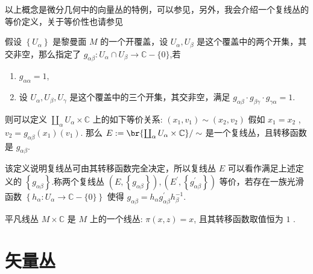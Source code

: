 以上概念是微分几何中的向量丛的特例，可以参见\cite{吴大任1979微分几何讲义}，另外，我会介绍一个复线丛的等价定义，关于等价性也请参见\cite{吴大任1979微分几何讲义}
\begin{definition}[][复线丛的等价定义]
    假设 $\left\{U_\alpha\right\}$ 是黎曼面 $M$ 的一个开覆盖，设 $U_\alpha, U_\beta$ 是这个覆盖中的两个开集，其交非空，那么指定了
$g_{\alpha \beta}: U_\alpha \cap U_\beta \rightarrow \mathbb{C}-\{0\}$,若
\begin{enumerate}
    \item $ g_{\alpha \alpha}=1$,
    \item 设 $U_\alpha, U_\beta, U_\gamma$ 是这个覆盖中的三个开集，其交非空，满足
$g_{\alpha \beta} \cdot g_{\beta \gamma} \cdot g_{\gamma \alpha}=1$.
\end{enumerate}
则可以定义 $\coprod_\alpha U_\alpha \times \mathbb{C}$ 上的如下等价关系: $\left(x_1, v_1\right) \sim\left(x_2, v_2\right)$ 假如 $x_1=x_2$ ,
$v_2=g_{\alpha \beta}\left(x_1\right)\left(v_1\right)$. 那么 $E:=\br{\coprod_\alpha U_\alpha \times \mathbb{C}} / \sim$ 是一个复线丛，且转移函数是 $g_{\alpha \beta}$.
\end{definition}
\begin{remark}
    该定义说明复线丛可由其转移函数完全决定，所以复线丛 $E$ 可以看作满足上述定义的 $\left\{g_{\alpha \beta}\right\}$.称两个复线丛 $\left(E,\left\{g_{\alpha \beta}\right\}\right),\left(E^{\prime},\left\{g_{\alpha \beta}^{\prime}\right\}\right)$ 等价，若存在一族光滑函数 $\left\{h_\alpha: U_\alpha \rightarrow \mathbb{C}-\{0\}\right\}$ 使得 $g_{\alpha \beta}=h_\alpha g_{\alpha \beta}^{\prime} h_\beta^{-1}$.
\end{remark}
\begin{example}
    平凡线丛 $M \times \mathbb{C}$ 是 $M$ 上的一个线丛: $\pi(x, z)=x$, 且其转移函数取值恒为 $1$ .
\end{example}

\section{矢量丛}
